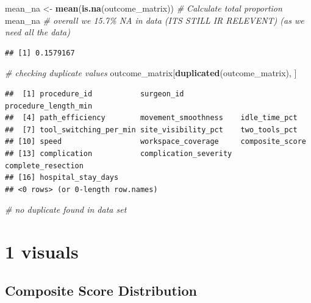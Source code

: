 \documentclass[
]{article}
\newenvironment{Shaded}{\begin{snugshade}}{\end{snugshade}}
\newcommand{\CommentTok}[1]{\textcolor[rgb]{0.56,0.35,0.01}{\textit{#1}}}
\newcommand{\FunctionTok}[1]{\textcolor[rgb]{0.13,0.29,0.53}{\textbf{#1}}}
\newcommand{\NormalTok}[1]{#1}
\newcommand{\OtherTok}[1]{\textcolor[rgb]{0.56,0.35,0.01}{#1}}
\begin{document}
\begin{Shaded}
\begin{Highlighting}[]
\NormalTok{mean\_na }\OtherTok{\textless{}{-}} \FunctionTok{mean}\NormalTok{(}\FunctionTok{is.na}\NormalTok{(outcome\_matrix)) }\CommentTok{\# Calculate total proportion}
\NormalTok{mean\_na }\CommentTok{\# overall we 15.7\% NA in data (ITS STILL IR RELEVENT) (as we need all the data) }
\end{Highlighting}
\end{Shaded}

\begin{verbatim}
## [1] 0.1579167
\end{verbatim}

\begin{Shaded}
\begin{Highlighting}[]
\CommentTok{\# checking duplicate values }
\NormalTok{outcome\_matrix[}\FunctionTok{duplicated}\NormalTok{(outcome\_matrix), ]}
\end{Highlighting}
\end{Shaded}

\begin{verbatim}
##  [1] procedure_id           surgeon_id             procedure_length_min  
##  [4] path_efficiency        movement_smoothness    idle_time_pct         
##  [7] tool_switching_per_min site_visibility_pct    two_tools_pct         
## [10] speed                  workspace_coverage     composite_score       
## [13] complication           complication_severity  complete_resection    
## [16] hospital_stay_days    
## <0 rows> (or 0-length row.names)
\end{verbatim}

\begin{Shaded}
\begin{Highlighting}[]
\CommentTok{\# no duplicate found in data set}
\end{Highlighting}
\end{Shaded}

\section{1 visuals}\label{visuals}

\subsection{Composite Score
Distribution}\label{composite-score-distribution}
\end{document}

